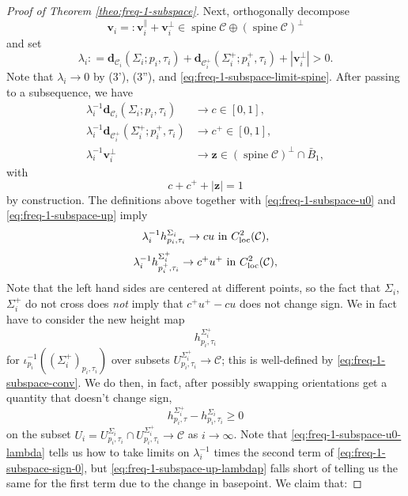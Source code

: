 \documentclass[11pt, letterpaper, reqno]{amsart}
\numberwithin{equation}{section}
\theoremstyle{remark}
\newcommand{\cC}{\mathcal{C}}
\newcommand{\mbfd}{\mathbf{d}}
\newcommand{\mbfv}{\mathbf{v}}
\newcommand{\mbfz}{\mathbf{z}}
\newcommand{\spine}{\operatorname{spine}}
\begin{document}
\begin{proof}[Proof of Theorem \ref{theo:freq-1-subspace}]
Next, orthogonally decompose
\[ \mbfv_i =: \mbfv_i^\parallel + \mbfv_i^\perp \in \spine \cC \oplus (\spine \cC)^\perp \]
and set
\begin{equation} \label{eq:freq-1-subspace-di}
\lambda_i : = \mbfd_{\cC_i}(\Sigma_i;p_i,\tau_i) + \mbfd_{\cC_i^+}(\Sigma_i^+;p_i^+,\tau_i) + |\mbfv_i^\perp| > 0.
\end{equation}
Note that $\lambda_i \to 0$ by (3'), (3''), and \eqref{eq:freq-1-subspace-limit-spine}. After passing to a subsequence, we have
\begin{align*}
	\lambda_i^{-1} \mbfd_{\cC_i}(\Sigma_i;p_i,\tau_i) & \to c \in [0, 1], \\
	\lambda_i^{-1} \mbfd_{\cC_i^+}(\Sigma_i^+;p_i^+,\tau_i) & \to c^+ \in [0, 1], \\
	\lambda_i^{-1} \mbfv_i^\perp & \to \mbfz \in (\spine \cC)^\perp \cap \bar B_1,
\end{align*}
with
\[ c + c^+ + |\mbfz| = 1 \]
by construction. The definitions above together with \eqref{eq:freq-1-subspace-u0} and \eqref{eq:freq-1-subspace-up} imply
\begin{equation} \label{eq:freq-1-subspace-u0-lambda}
	\lambda_i^{-1} h^{\Sigma_i}_{p_i,\tau_i} \to c u \text{ in } C^2_\textnormal{loc}(\cC),
\end{equation}
\begin{equation} \label{eq:freq-1-subspace-up-lambdap}
	\lambda_i^{-1} h^{\Sigma^+_i}_{p^+_i, \tau_i} \to c^+ u^+ \text{ in } C^2_\textnormal{loc}(\cC),
\end{equation}
Note that the left hand sides are centered at different points, so the fact that $\Sigma_i$, $\Sigma^+_i$ do not cross does \emph{not} imply that $c^+ u^+ - c u$ does not change sign. We in fact have to consider the new height map
\[ h^{\Sigma_i^+}_{p_i, \tau_i} \]
for $\iota_{p_i}^{-1}((\Sigma_i^+)_{p_i, \tau_i})$ over subsets $U^{\Sigma_i^+}_{p_i, \tau_i} \to \cC$; this is well-defined by \eqref{eq:freq-1-subspace-conv}. We do then, in fact, after possibly swapping orientations get a quantity that doesn't change sign,
\begin{equation} \label{eq:freq-1-subspace-sign-0}
	h^{\Sigma^+_i}_{p_i, \tau} - h^{\Sigma_i}_{p_i, \tau_i} \geq 0
\end{equation}
on the subset $U_i = U^{\Sigma_i}_{p_i, \tau_i} \cap U^{\Sigma_i^+}_{p_i, \tau_i} \to \cC$ as $i \to \infty$. Note that \eqref{eq:freq-1-subspace-u0-lambda} tells us how to take limits on $\lambda_i^{-1}$ times the second term of \eqref{eq:freq-1-subspace-sign-0}, but \eqref{eq:freq-1-subspace-up-lambdap} falls short of telling us the same for the first term due to the change in basepoint. We claim that:

\end{proof}
\end{document}
